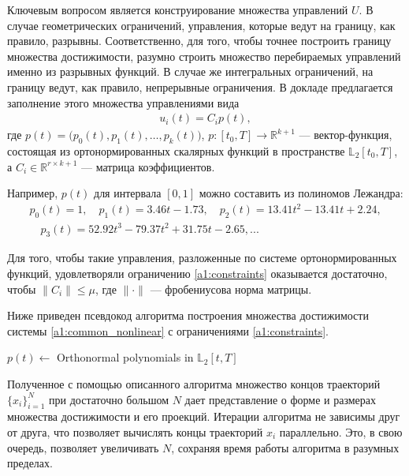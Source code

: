 \documentclass[../main.tex]{subfiles}
\begin{document}
  Ключевым вопросом является конструирование множества управлений $U$.
  В случае геометрических ограничений, управления, которые ведут на границу, как правило, разрывны.
  Соответственно, для того, чтобы точнее построить границу множества достижимости, разумно строить множество перебираемых управлений именно из разрывных функций. 
  В случае же интегральных ограничений, на границу ведут, как правило, непрерывные ограничения. 
  В докладе предлагается заполнение этого множества управлениями вида 
  \begin{gather}
  	u_i(t) = C_i p (t),
  \end{gather}
  где $p(t) = \big(p_{0}(t),p_{1}(t),\dots,p_{k}(t)\big)$, $p: [t_0, {T}] \rightarrow \mathbb{R}^{k+1} $ --- вектор-функция, состоящая из ортонормированных скалярных функций в пространстве $\mathbb{L}_2[t_0, {T}]$, а $C_i \in \mathbb{R}^{r \times k+1}$ --- матрица коэффициентов. 
  
  Например, $p(t)$ для интервала $[0,1]$ можно составить из полиномов Лежандра:
  \begin{gather*}
  	p_0(t) = 1, \quad p_1(t) = 3.46t-1.73, \quad p_2(t) = 13.41t^2 - 13.41t + 2.24, \\ \quad 
  	p_3(t) = 52.92t^3 - 79.37t^2+31.75t -2.65, ...
  \end{gather*}
  
  Для того, чтобы такие управления, разложенные по системе ортонормированных функций, удовлетворяли ограничению \eqref{a1:constraints} оказывается достаточно, чтобы $\|C_i\| \leqslant \mu$, где $\|\cdot\| $ --- фробениусова норма матрицы.
  
  Ниже приведен псевдокод алгоритма построения множества достижимости системы \eqref{a1:common_nonlinear} с ограничениями \eqref{a1:constraints}.
  \begin{algorithm}[hbt!]
  	$p(t) \gets $ Orthonormal polynomials in $\mathbb{L}_2[t,T]$ \;
  \end{algorithm}
  
  Полученное с помощью описанного алгоритма множество концов траекторий $\{x_i\}_{i = 1}^{N}$ при достаточно большом $N$ дает представление о форме и размерах множества достижимости и его проекций. 
  Итерации алгоритма не зависимы друг от друга, что позволяет вычислять концы траекторий $x_i$ параллельно. 
  Это, в свою очередь, позволяет увеличивать $N$, сохраняя время работы алгоритма в разумных пределах.
  
\end{document}
